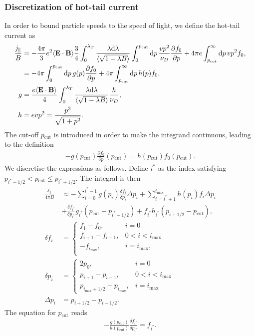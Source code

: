 \documentclass[11pt,a4paper]{article}
\newcommand{\rd}{\ensuremath{\mathrm{d}}}
\newcommand{\sub}[1]{\ensuremath{_{\text{#1}}}}
\renewcommand{\b}[1]{\ensuremath{ {\bf #1 } }}
\begin{document}
\subsubsection{Discretization of hot-tail current}
In order to bound particle speeds to the speed of light, we define the hot-tail current as
\begin{align}
\frac{j_\parallel}{B} &= -\frac{4\pi}{3}e^2\langle \b{E}\cdot\b{B}\rangle  \frac{3}{4}\int_0^{\lambda_T}\frac{\lambda \rd\lambda}{\langle\sqrt{1-\lambda B}\rangle}\int_0^{p\sub{cut}} \rd p \,\frac{vp^2}{\nu_D}\frac{\partial f_0}{\partial p} + 4\pi e \int_{p\sub{cut}}^\infty \rd p \, vp^2 f_0, \nonumber \\
&= -4\pi \int_0^{p\sub{cut}} \rd p \, g(p)\frac{\partial f_0}{\partial p} + 4\pi \int_{p\sub{cut}}^\infty \rd p \, h(p) f_0, \\
g &= \frac{ e\langle\b{E}\cdot\b{B}\rangle }{4}\int_0^{\lambda_T}\frac{\lambda \rd \lambda}{\langle\sqrt{1-\lambda B}\rangle}\frac{h}{\nu_D}, \\
h &= evp^2 = \frac{p^3}{\sqrt{1+p^2}}.
\end{align}
The cut-off $p\sub{cut}$ is introduced in order to make the integrand continuous, leading to the definition
\begin{align}
-g(p\sub{cut})\frac{\partial f_0}{\partial p}(p\sub{cut}) = h(p\sub{cut}) f_0(p\sub{cut}) .
\end{align}
We discretise the expressions as follows. Define $i^*$ as the index satisfying $p_{i^*-1/2} < p\sub{cut} \leq p_{i^* + 1/2}$. The integral is then
\begin{align}
\frac{j_\parallel}{4\pi B} &\approx - \sum_{i=0}^{i^*-1} g(p_i) \frac{\delta f_{i}}{\delta p_i} \Delta p_i + \sum_{i=i^*+1}^{i\sub{max}}h(p_i)f_i \Delta p_i \nonumber \\
&+ \frac{\delta f_{i^*}}{\delta p_{i^*}}g_{i^*}(p\sub{cut} - p_{i^*-1/2}) + f_{i^*}h_{i^*}(p_{i+1/2} - p\sub{cut}),  \\
\delta f_i &= \begin{cases}
f_1-f_0, & i=0 \\
f_{i+1}-f_{i-1}, & 0 < i < i\sub{max} \\
-f_{i\sub{max}}, & i=i\sub{max}, \\
\end{cases} \\
\delta p_i &= \begin{cases}
2 p_0, & i=0 \\
p_{i+1}-p_{i-1}, & 0 < i < i\sub{max} \\
p_{i\sub{max}+1/2} - p_{i\sub{max}}, & i=i\sub{max}
\end{cases} \\
\Delta p_i &= p_{i+1/2} - p_{i-1/2}.
\end{align}
The equation for $p\sub{cut}$ reads
\begin{align}
-\frac{g(p\sub{cut})}{h(p\sub{cut}) }\frac{\delta f_{i^*}}{\delta p_{i^*}} = f_{i^*}.
\end{align}
\end{document}
